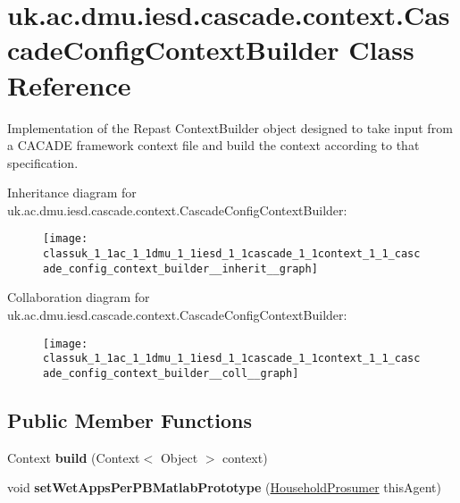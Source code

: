 \hypertarget{classuk_1_1ac_1_1dmu_1_1iesd_1_1cascade_1_1context_1_1_cascade_config_context_builder}{\section{uk.\-ac.\-dmu.\-iesd.\-cascade.\-context.\-Cascade\-Config\-Context\-Builder Class Reference}
\label{classuk_1_1ac_1_1dmu_1_1iesd_1_1cascade_1_1context_1_1_cascade_config_context_builder}
}


Implementation of the Repast Context\-Builder object designed to take input from a C\-A\-C\-A\-D\-E framework context file and build the context according to that specification.  




Inheritance diagram for uk.\-ac.\-dmu.\-iesd.\-cascade.\-context.\-Cascade\-Config\-Context\-Builder\-:\nopagebreak
\begin{figure}[H]
\begin{center}
\leavevmode
\texttt{[image: classuk\_1\_1ac\_1\_1dmu\_1\_1iesd\_1\_1cascade\_1\_1context\_1\_1\_cascade\_config\_context\_builder\_\_inherit\_\_graph]}
\end{center}
\end{figure}


Collaboration diagram for uk.\-ac.\-dmu.\-iesd.\-cascade.\-context.\-Cascade\-Config\-Context\-Builder\-:\nopagebreak
\begin{figure}[H]
\begin{center}
\leavevmode
\texttt{[image: classuk\_1\_1ac\_1\_1dmu\_1\_1iesd\_1\_1cascade\_1\_1context\_1\_1\_cascade\_config\_context\_builder\_\_coll\_\_graph]}
\end{center}
\end{figure}
\subsection*{Public Member Functions}
\begin{DoxyCompactItemize}
\item 
\hypertarget{classuk_1_1ac_1_1dmu_1_1iesd_1_1cascade_1_1context_1_1_cascade_config_context_builder_a3147d4d89fe782b9bfa32a77ea93d2ff}{Context {\bfseries build} (Context$<$ Object $>$ context)}\label{classuk_1_1ac_1_1dmu_1_1iesd_1_1cascade_1_1context_1_1_cascade_config_context_builder_a3147d4d89fe782b9bfa32a77ea93d2ff}

\item 
\hypertarget{classuk_1_1ac_1_1dmu_1_1iesd_1_1cascade_1_1context_1_1_cascade_config_context_builder_af4055c7b37a1fada353beddd2b9d62b6}{void {\bfseries set\-Wet\-Apps\-Per\-P\-B\-Matlab\-Prototype} (\hyperlink{classuk_1_1ac_1_1dmu_1_1iesd_1_1cascade_1_1agents_1_1prosumers_1_1_household_prosumer}{Household\-Prosumer} this\-Agent)}\label{classuk_1_1ac_1_1dmu_1_1iesd_1_1cascade_1_1context_1_1_cascade_config_context_builder_af4055c7b37a1fada353beddd2b9d62b6}

\end{DoxyCompactItemize}



